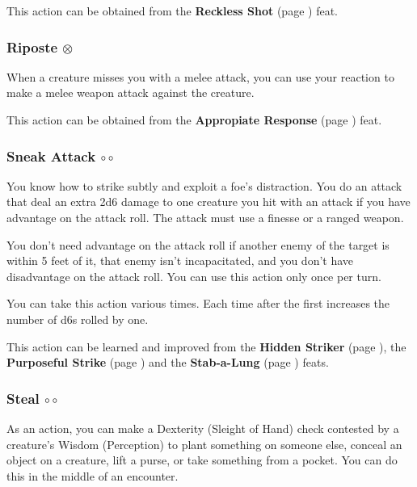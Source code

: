         This action can be obtained from the \textbf{Reckless Shot} (page \pageref{feat::recklessshot}) feat.
    \subsubsection{Riposte $\otimes$} \label{act::riposte}
        When a creature misses you with a melee attack, you can use your reaction to make a melee weapon attack against the creature.

        This action can be obtained from the \textbf{Appropiate Response} (page \pageref{feat::appropiateresponse}) feat.
    \subsubsection{Sneak Attack $\circ\circ$} \label{act::sneakattack}
        You know how to strike subtly and exploit a foe's distraction.
        You do an attack that deal an extra 2d6 damage to one creature you hit with an attack if you have advantage on the attack roll.
        The attack must use a finesse or a ranged weapon.

        You don't need advantage on the attack roll if another enemy of the target is within 5 feet of it, that enemy isn't incapacitated, and you don't have disadvantage on the attack roll.
        You can use this action only once per turn.

        You can take this action various times.
        Each time after the first increases the number of d6s rolled by one.

        This action can be learned and improved from the \textbf{Hidden Striker} (page \pageref{feat::hiddenstriker}), the \textbf{Purposeful Strike} (page \pageref{feat::purposefulstrike}) and the \textbf{Stab-a-Lung} (page \pageref{feat::stabalung}) feats.
    \subsubsection{Steal $\circ\circ$} \label{act::steal}
        As an action, you can make a Dexterity (Sleight of Hand) check contested by a creature's Wisdom (Perception) to plant something on someone else, conceal an object on a creature, lift a purse, or take something from a pocket.
        You can do this in the middle of an encounter.

